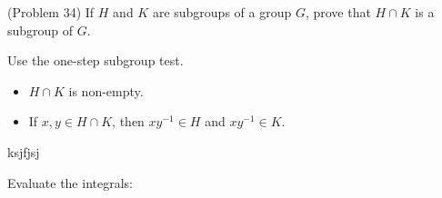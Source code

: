 \documentclass[12pt]{exam}
\begin{document}
\begin{questions}
\question[] (Problem 34) If \(H\) and \(K\) are subgroups of a group \(G\), prove that \(H \cap K\) is a subgroup of \(G\).

\begin{solution}
    Use the one-step subgroup test. 
    \begin{itemize}
        \item \(H \cap K\) is non-empty.
        \item If \(x,y \in H \cap K\), then \(xy^{-1} \in H\) and \(xy^{-1} \in K\).
    \end{itemize}
\end{solution}

\vfill
\droptotalpoints
\begin{solution}
    ksjfjsj
\end{solution}
\newpage

\question Evaluate the integrals:
\droptotalpoints
\newpage


\end{questions}
\end{document}

